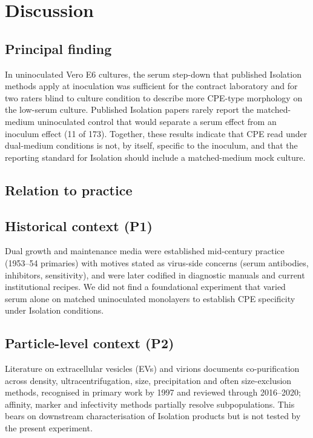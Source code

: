 \section*{Discussion}
\subsection*{Principal finding}
In uninoculated Vero E6 cultures, the serum step-down that published Isolation methods apply at inoculation was sufficient for the contract laboratory and for two raters blind to culture condition to describe more CPE-type morphology on the low-serum culture. Published Isolation papers rarely report the matched-medium uninoculated control that would separate a serum effect from an inoculum effect (11 of 173). Together, these results indicate that CPE read under dual-medium conditions is not, by itself, specific to the inoculum, and that the reporting standard for Isolation should include a matched-medium mock culture.

\subsection*{Relation to practice}

\subsection*{Historical context (P1)}
Dual growth and maintenance media were established mid-century practice (1953--54 primaries) with motives stated as virus-side concerns (serum antibodies, inhibitors, sensitivity), and were later codified in diagnostic manuals and current institutional recipes. We did not find a foundational experiment that varied serum alone on matched uninoculated monolayers to establish CPE specificity under Isolation conditions. 

\subsection*{Particle-level context (P2)}
Literature on extracellular vesicles (EVs) and virions documents co-purification across density, ultracentrifugation, size, precipitation and often size-exclusion methods, recognised in primary work by 1997 and reviewed through 2016--2020; affinity, marker and infectivity methods partially resolve subpopulations. This bears on downstream characterisation of Isolation products but is not tested by the present experiment. 

